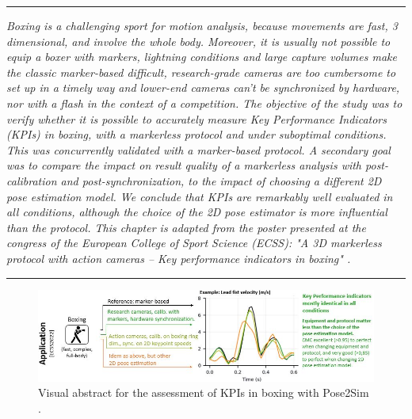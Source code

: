 \begin{center}
\rule{0.7\linewidth}{.5pt}
\begin{minipage}{0.7\linewidth}
\smallskip

\textit{Boxing is a challenging sport for motion analysis, because movements are fast, 3 dimensional, and involve the whole body. Moreover, it is usually not possible to equip a boxer with markers, lightning conditions and large capture volumes make the classic marker-based difficult, research-grade cameras are too cumbersome to set up in a timely way and lower-end cameras can't be synchronized by hardware, nor with a flash in the context of a competition.\newline\newline
The objective of the study was to verify whether it is possible to accurately measure Key Performance Indicators (KPIs) in boxing, with a markerless protocol and under suboptimal conditions. This was concurrently validated with a marker-based protocol. A secondary goal was to compare the impact on result quality of a markerless analysis with post-calibration and post-synchronization, to the impact of choosing a different 2D pose estimation model. We conclude that KPIs are remarkably well evaluated in all conditions, although the choice of the 2D pose estimator is more influential than the protocol. \newline \newline
This chapter is adapted from the poster presented at the congress of the European College of Sport Science (ECSS): "A 3D markerless protocol with action cameras – Key performance indicators in boxing" \cite{Pagnon2022c}.
}

\end{minipage}
\smallskip
\rule{0.7\linewidth}{.5pt}
\end{center}

\clearpage

\minitoc

\vspace*{3cm}

\begin{figure}[hbtp]
	\centering
	\def\svgwidth{1\columnwidth}
	\fontsize{10pt}{10pt}\selectfont
	\includegraphics[width=\linewidth]{"../Intro/Figures/Fig_VisAbstract4.JPG"}
      \caption{Visual abstract for the assessment of KPIs in boxing with Pose2Sim \cite{Pagnon2022c}.}
	\label{fig_visabstract4}
\end{figure}

